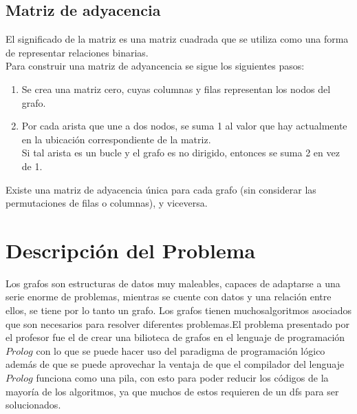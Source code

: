 \documentclass[10pt,a4paper]{article}
\begin{document}
\subsection{Matriz de adyacencia}
El significado de la matriz es una matriz cuadrada que se utiliza como una forma de representar relaciones binarias.\\

Para construir una matriz de adyancencia se sigue los siguientes pasos:
\begin{enumerate}
\item Se crea una matriz cero, cuyas columnas y filas representan los nodos del grafo.
\item Por cada arista que une a dos nodos, se suma 1 al valor que hay actualmente en la ubicación correspondiente de la matriz.\\
	Si tal arista es un bucle y el 			grafo es no dirigido, entonces se 	suma 2 en vez de 1.
\end{enumerate}
Existe una matriz de adyacencia única para cada grafo (sin considerar las permutaciones de filas o columnas), y viceversa.
\cite{Matriz}\\
\pagebreak
\section{Descripción del Problema}
	Los grafos son estructuras de datos muy maleables, capaces de adaptarse a una serie enorme de problemas, mientras se cuente con datos y una relación entre ellos, se tiene por lo tanto un grafo. Los grafos tienen muchosalgoritmos asociados que son necesarios para resolver diferentes problemas.El problema presentado por el profesor fue el de crear una bilioteca de grafos en el lenguaje  de programación $Prolog$ con lo que se puede hacer uso del paradigma de programación lógico además de que se puede aprovechar la ventaja de que el compilador del lenguaje $Prolog$ funciona como una pila, con esto para poder reducir los códigos de la mayoría de los algoritmos, ya que muchos de estos requieren de un dfs para ser solucionados. 
\end{document}
